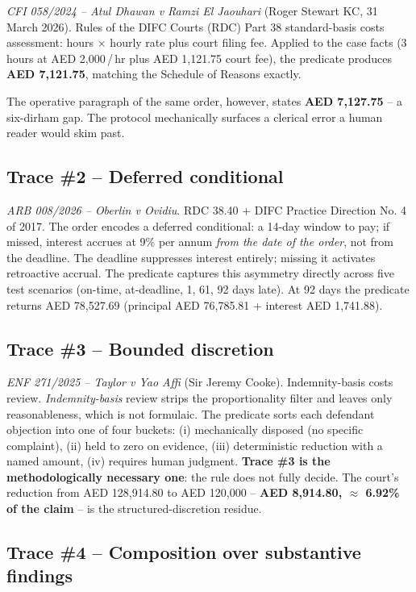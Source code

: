 \documentclass[11pt,letterpaper]{article}
\begin{document}
\textit{CFI 058/2024 -- Atul Dhawan v Ramzi El Jaouhari} (Roger Stewart KC, 31 March 2026). Rules of the DIFC Courts (RDC) Part 38 standard-basis costs assessment: hours $\times$ hourly rate plus court filing fee. Applied to the case facts (3 hours at AED 2{,}000\,/\,hr plus AED 1{,}121.75 court fee), the predicate produces \textbf{AED 7{,}121.75}, matching the Schedule of Reasons exactly.

The operative paragraph of the same order, however, states \textbf{AED 7{,}127.75} -- a six-dirham gap. The protocol mechanically surfaces a clerical error a human reader would skim past.

\subsection{Trace \#2 -- Deferred conditional}

\textit{ARB 008/2026 -- Oberlin v Ovidiu}. RDC 38.40 + DIFC Practice Direction No. 4 of 2017. The order encodes a deferred conditional: a 14-day window to pay; if missed, interest accrues at 9\% per annum \textit{from the date of the order}, not from the deadline. The deadline suppresses interest entirely; missing it activates retroactive accrual. The predicate captures this asymmetry directly across five test scenarios (on-time, at-deadline, 1, 61, 92 days late). At 92 days the predicate returns AED 78{,}527.69 (principal AED 76{,}785.81 + interest AED 1{,}741.88).

\subsection{Trace \#3 -- Bounded discretion}

\textit{ENF 271/2025 -- Taylor v Yao Affi} (Sir Jeremy Cooke). Indemnity-basis costs review. \textit{Indemnity-basis} review strips the proportionality filter and leaves only reasonableness, which is not formulaic. The predicate sorts each defendant objection into one of four buckets: (i) mechanically disposed (no specific complaint), (ii) held to zero on evidence, (iii) deterministic reduction with a named amount, (iv) requires human judgment. \textbf{Trace \#3 is the methodologically necessary one}: the rule does not fully decide. The court's reduction from AED 128{,}914.80 to AED 120{,}000 -- \textbf{AED 8{,}914.80, $\approx$ 6.92\% of the claim} -- is the structured-discretion residue.

\subsection{Trace \#4 -- Composition over substantive findings}
\end{document}
